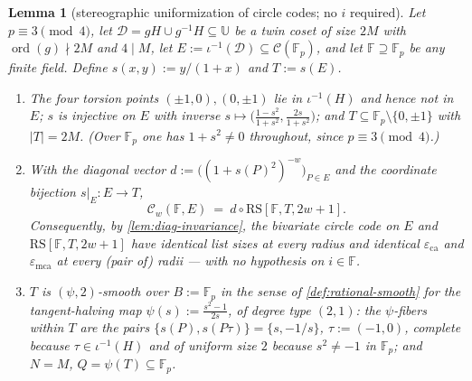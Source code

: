 \documentclass[11pt]{article}
\newtheorem{lemma}[lemma]{Lemma}
\theoremstyle{definition}
\theoremstyle{remark}
\newcommand{\F}{\mathbb{F}}
\newcommand{\B}{B}
\newcommand{\RS}{\mathrm{RS}}
\newcommand{\eca}{\varepsilon_{\mathrm{ca}}}
\newcommand{\emca}{\varepsilon_{\mathrm{mca}}}
\newcommand{\UU}{\mathbb{U}}
\begin{document}
\begin{lemma}[stereographic uniformization of circle codes; no $i$ required]\label{lem:stereographic}
Let $p\equiv3\pmod4$, let $\mathcal D=gH\cup g^{-1}H\subseteq\UU$ be a twin coset of size $2M$ with $\operatorname{ord}(g)\nmid2M$ and $4\mid M$, let $E:=\iota^{-1}(\mathcal D)\subseteq\mathcal C(\F_p)$, and let $\F\supseteq\F_p$ be \emph{any} finite field. Define $s(x,y):=y/(1+x)$ and $T:=s(E)$.
\begin{enumerate}[label=\textup{(\roman*)}]
\item The four torsion points $(\pm1,0),(0,\pm1)$ lie in $\iota^{-1}(H)$ and hence not in $E$; $s$ is injective on $E$ with inverse $s\mapsto\bigl(\frac{1-s^2}{1+s^2},\frac{2s}{1+s^2}\bigr)$; and $T\subseteq\F_p\setminus\{0,\pm1\}$ with $|T|=2M$. \textup(Over $\F_p$ one has $1+s^2\ne0$ throughout, since $p\equiv3\pmod4$.\textup)
\item With the diagonal vector $d:=\bigl((1+s(P)^2)^{-w}\bigr)_{P\in E}$ and the coordinate bijection $s|_E:E\to T$,
\[
\mathcal C_w(\F,E)\ =\ d\circ\RS[\F,T,2w+1].
\]
Consequently, by \cref{lem:diag-invariance}, the bivariate circle code on $E$ and $\RS[\F,T,2w+1]$ have identical list sizes at every radius and identical $\eca$ and $\emca$ at every \textup(pair of\textup) radii --- with no hypothesis on $i\in\F$.
\item $T$ is $(\psi,2)$-smooth over $\B:=\F_p$ in the sense of \cref{def:rational-smooth} for the tangent-halving map $\psi(s):=\frac{s^2-1}{2s}$, of degree type $(2,1)$: the $\psi$-fibers within $T$ are the pairs $\{s(P),s(P\tau)\}=\{s,-1/s\}$, $\tau:=(-1,0)$, complete because $\tau\in\iota^{-1}(H)$ and of uniform size $2$ because $s^2\ne-1$ in $\F_p$; and $N=M$, $Q=\psi(T)\subseteq\F_p$.
\end{enumerate}
\end{lemma}
\end{document}
